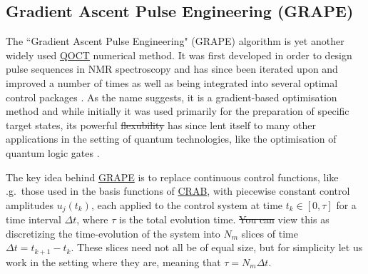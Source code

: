 \documentclass[a4paper,oneside,11pt]{book}
\newcommand{\acrref}[1]{\hyperref[acr:#1]{#1}}
\providecommand{\DIFaddtex}[1]{{\protect\color{blue}\uwave{#1}}} %
\providecommand{\DIFdeltex}[1]{{\protect\color{red}\sout{#1}}}                      %
\providecommand{\DIFaddbegin}{} %
\providecommand{\DIFaddend}{} %
\providecommand{\DIFdelbegin}{} %
\providecommand{\DIFdelend}{} %
\providecommand{\DIFadd}[1]{\texorpdfstring{\DIFaddtex{#1}}{#1}} %
\providecommand{\DIFdel}[1]{\texorpdfstring{\DIFdeltex{#1}}{}} %
\newcommand{\DIFscaledelfig}{0.5}
\newlength{\DIFdelgraphicswidth} %
\newlength{\DIFdelgraphicsheight} %
\newcommand{\DIFaddincludegraphics}[2][]{{\color{blue}\fbox{\DIFOincludegraphics[#1]{#2}}}} %
\newcommand{\DIFdelincludegraphics}[2][]{%
\sbox{\DIFdelgraphicsbox}{\DIFOincludegraphics[#1]{#2}}%
\settoboxwidth{\DIFdelgraphicswidth}{\DIFdelgraphicsbox} %
\settoboxtotalheight{\DIFdelgraphicsheight}{\DIFdelgraphicsbox} %
\scalebox{\DIFscaledelfig}{%
\parbox[b]{\DIFdelgraphicswidth}{\usebox{\DIFdelgraphicsbox}\\[-\baselineskip] \rule{\DIFdelgraphicswidth}{0em}}\llap{\resizebox{\DIFdelgraphicswidth}{\DIFdelgraphicsheight}{%
\setlength{\unitlength}{\DIFdelgraphicswidth}%
\begin{picture}(1,1)%
\thicklines\linethickness{2pt} %
{\color[rgb]{1,0,0}\put(0,0){\framebox(1,1){}}}%
{\color[rgb]{1,0,0}\put(0,0){\line( 1,1){1}}}%
{\color[rgb]{1,0,0}\put(0,1){\line(1,-1){1}}}%
\end{picture}%
}\hspace*{3pt}}} %
} %
\DeclareRobustCommand{\DIFaddbegin}{\DIFOaddbegin \let\includegraphics\DIFaddincludegraphics} %
\DeclareRobustCommand{\DIFaddend}{\DIFOaddend \let\includegraphics\DIFOincludegraphics} %
\DeclareRobustCommand{\DIFdelbegin}{\DIFOdelbegin \let\includegraphics\DIFdelincludegraphics} %
\DeclareRobustCommand{\DIFdelend}{\DIFOaddend \let\includegraphics\DIFOincludegraphics} %
\begin{document}
\subsection{Gradient Ascent Pulse Engineering (GRAPE)}\label{sec:3.3.2_GRAPE}

The ``Gradient Ascent Pulse Engineering" (GRAPE) algorithm is yet another widely used \acrref{QOCT} numerical method. It was first developed in order to design pulse sequences in NMR spectroscopy \cite{khaneja_optimal_2005} and has since been iterated upon and improved a number of times as well as being integrated into several optimal control packages \cite{de_fouquieres_second_2011, chen_iterative_2022, machnes_comparing_2011, johansson_qutip_2013}. As the name suggests, it is a gradient-based optimisation method and while initially it was used primarily for the preparation of specific target states, its powerful \DIFdelbegin \DIFdel{flexubility }\DIFdelend \DIFaddbegin \DIFadd{flexibility }\DIFaddend has since lent itself to many other applications in the setting of quantum technologies, like the optimisation of quantum logic gates \cite{motzoi_optimal_2011, anderson_accurate_2015}.

The key idea behind \acrref{GRAPE} is to replace continuous control functions, like \@e.g.~those used in the basis functions of \acrref{CRAB}, with piecewise constant control amplitudes $u_j(t_k)$, each applied to the control system at time $t_k \in [0, \tau]$ for a time interval $\Delta t$, where $\tau$ is the total evolution time. \DIFdelbegin \DIFdel{You can }\DIFdelend \DIFaddbegin \DIFadd{One may }\DIFaddend view this as discretizing the time-evolution of the system into $N_m$ slices of time $\Delta t = t_{k + 1} - t_k$. These slices need not all be of equal size, but for simplicity let us work in the setting where they are, meaning that $\tau = N_m \Delta t$.
\end{document}
